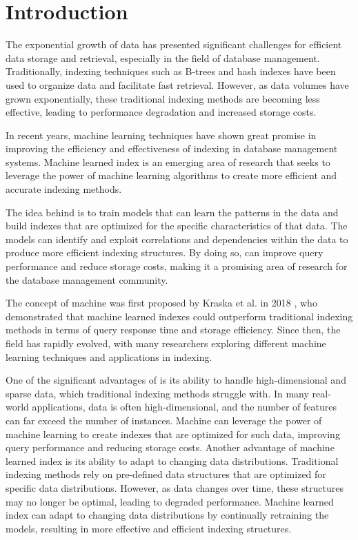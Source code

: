 \section{Introduction}
The exponential growth of data has presented significant challenges for efficient data storage and retrieval, especially in the field of database management. Traditionally, indexing techniques such as B-trees and hash indexes have been used to organize data and facilitate fast retrieval. However, as data volumes have grown exponentially, these traditional indexing methods are becoming less effective, leading to performance degradation and increased storage costs.

In recent years, machine learning techniques have shown great promise in improving the efficiency and effectiveness of indexing in database management systems. Machine learned index is an emerging area of research that seeks to leverage the power of machine learning algorithms to create more efficient and accurate indexing methods.

The idea behind \learnindex is to train models that can learn the patterns in the data and build indexes that are optimized for the specific characteristics of that data. The models can identify and exploit correlations and dependencies within the data to produce more efficient indexing structures. By doing so, \learnindex can improve query performance and reduce storage costs, making it a promising area of research for the database management community.

The concept of machine \learnindex was first proposed by Kraska et al. in 2018 \cite{CasedLearnedIndex}, who demonstrated that machine learned indexes could outperform traditional indexing methods in terms of query response time and storage efficiency. Since then, the field has rapidly evolved, with many researchers exploring different machine learning techniques and applications in indexing.

One of the significant advantages of \learnindex is its ability to handle high-dimensional and sparse data, which traditional indexing methods struggle with. In many real-world applications, data is often high-dimensional, and the number of features can far exceed the number of instances. Machine \learnindex can leverage the power of machine learning to create indexes that are optimized for such data, improving query performance and reducing storage costs. Another advantage of machine learned index is its ability to adapt to changing data distributions. Traditional indexing methods rely on pre-defined data structures that are optimized for specific data distributions. However, as data changes over time, these structures may no longer be optimal, leading to degraded performance. Machine learned index can adapt to changing data distributions by continually retraining the models, resulting in more effective and efficient indexing structures. 

